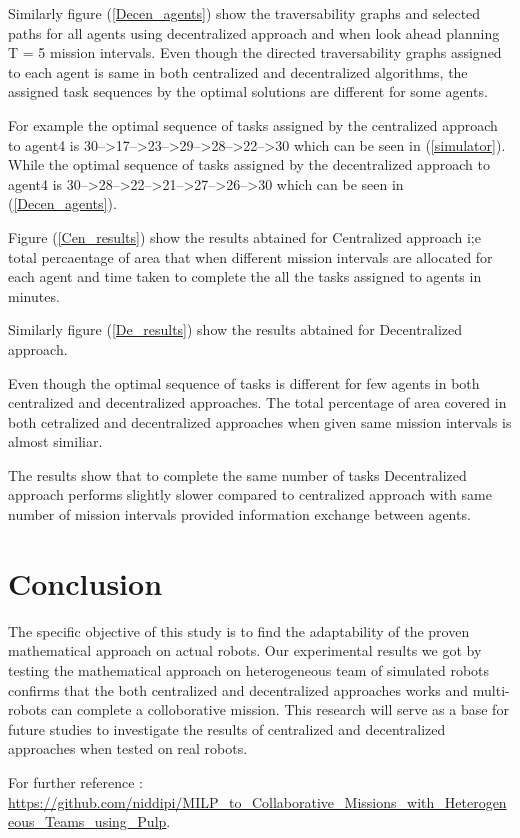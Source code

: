 \documentclass[conference]{IEEEtran}
\begin{document}
{Similarly figure (\ref{Decen_agents}) show the traversability graphs and selected paths for all agents using decentralized approach and when look ahead planning T = 5 mission intervals. Even though the directed traversability graphs assigned to each agent is same in both centralized and decentralized algorithms, the assigned task sequences by the optimal solutions are different for some agents.

For example the optimal sequence of tasks assigned by the centralized approach to agent4 is 30-->17-->23-->29-->28-->22-->30 which can be seen in (\ref{simulator}). While the optimal sequence of tasks assigned by the decentralized approach to agent4 is 30-->28-->22-->21-->27-->26-->30 which can be seen in (\ref{Decen_agents}).

 Figure (\ref{Cen_results}) show the results abtained for Centralized approach i;e total percaentage of area that when different mission intervals are allocated for each agent and time taken to complete the all the tasks assigned to agents in minutes.

Similarly figure (\ref{De_results}) show the results abtained for Decentralized approach. 

Even though the optimal sequence of tasks is different for few agents in both  centralized and decentralized approaches. The total percentage of area covered in both cetralized and decentralized approaches when given same mission intervals is almost similiar. 

The results show that to complete the same number of tasks Decentralized approach performs slightly slower compared to centralized approach with same number of mission intervals provided information exchange between agents.


\section{Conclusion}
The specific objective of this study is to find the adaptability of the proven mathematical approach on actual robots. Our experimental results we got by testing the mathematical approach on heterogeneous team of simulated robots confirms that the both centralized and decentralized approaches works and multi-robots can complete a colloborative mission. 
This research will serve as a base for future studies to investigate the results of centralized and decentralized approaches when tested on real robots.
 
For further reference : \url{https://github.com/niddipi/MILP_to_Collaborative_Missions_with_Heterogeneous_Teams_using_Pulp}.

}
\end{document}
